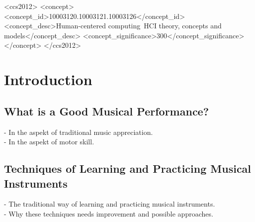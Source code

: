 \documentclass[sigconf]{acmart}
\begin{document}
\begin{CCSXML}
<ccs2012>
   <concept>
       <concept_id>10003120.10003121.10003126</concept_id>
       <concept_desc>Human-centered computing~HCI theory, concepts and models</concept_desc>
       <concept_significance>300</concept_significance>
       </concept>
 </ccs2012>
\end{CCSXML}




\maketitle

\section{Introduction}

\subsection{What is a Good Musical Performance?}
- In the aspekt of traditional music appreciation.\\
- In the aspekt of motor skill.

\subsection{Techniques of Learning and Practicing Musical Instruments}
- The traditional way of learning and practicing musical instruments.\\
- Why these techniques needs improvement and possible approaches.
\end{document}
